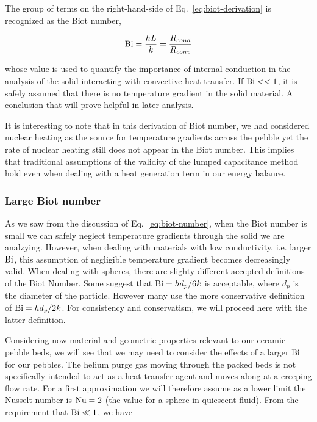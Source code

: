 The group of terms on the right-hand-side of Eq.~\ref{eq:biot-derivation} is recognized as the Biot number,

\begin{equation}\label{eq:biot-number}
	\mathrm{Bi}=\frac{hL}{k}=\frac{R_{cond}}{R_{conv}}
\end{equation}

whose value is used to quantify the importance of internal conduction in the analysis of the solid interacting with convective heat transfer. If $\mathrm{Bi}<<1$, it is safely assumed that there is no temperature gradient in the solid material. A conclusion that will prove helpful in later analysis.

It is interesting to note that in this derivation of Biot number, we had considered nuclear heating as the source for temperature gradients across the pebble yet the rate of nuclear heating still does not appear in the Biot number. This implies that traditional assumptions of the validity of the lumped capacitance method hold even when dealing with a heat generation term in our energy balance.





\subsubsection{Large Biot number}

As we saw from the discussion of Eq.~\ref{eq:biot-number}, when the Biot number is small we can safely neglect temperature gradients through the solid we are analzying. However, when dealing with materials with low conductivity, i.e. larger $\mathrm{Bi}$, this assumption of negligible temperature gradient becomes decreasingly valid.  When dealing with spheres, there are slighty different accepted definitions of the Biot Number.  Some suggest that $\mathrm{Bi}=hd_p/6k$ is acceptable\cite{incropera:245}, where $d_p$ is the diameter of the particle.  However many use the more conservative definition of $\mathrm{Bi}=hd_p/2k$\cite{incropera:245,jeffreson409}.  For consistency and conservatism, we will proceed here with the latter definition.  

Considering now material and geometric properties relevant to our ceramic pebble beds, we will see that we may need to consider the effects of a larger $\mathrm{Bi}$ for our pebbles. The helium purge gas moving through the packed beds is not specifically intended to act as a heat transfer agent and moves along at a creeping flow rate. For a first approximation we will therefore assume as a lower limit the Nusselt number is $\mathrm{Nu} = 2$ (the value for a sphere in quiescent fluid). From the requirement that $\mathrm{Bi} \ll 1$, we have

